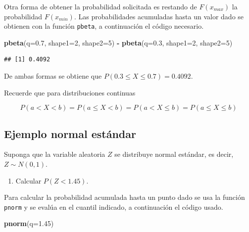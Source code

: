 \documentclass[10pt,]{krantz}
\makeatletter
\newenvironment{Shaded}{\begin{snugshade}}{\end{snugshade}}
\newcommand{\KeywordTok}[1]{\textcolor[rgb]{0.13,0.29,0.53}{\textbf{#1}}}
\newcommand{\DataTypeTok}[1]{\textcolor[rgb]{0.13,0.29,0.53}{#1}}
\newcommand{\DecValTok}[1]{\textcolor[rgb]{0.00,0.00,0.81}{#1}}
\newcommand{\FloatTok}[1]{\textcolor[rgb]{0.00,0.00,0.81}{#1}}
\newcommand{\StringTok}[1]{\textcolor[rgb]{0.31,0.60,0.02}{#1}}
\newcommand{\OperatorTok}[1]{\textcolor[rgb]{0.81,0.36,0.00}{\textbf{#1}}}
\newcommand{\NormalTok}[1]{#1}
\providecommand{\tightlist}{%
  \setlength{\itemsep}{0pt}\setlength{\parskip}{0pt}}
\newenvironment{kframe}{%
\medskip{}
\setlength{\fboxsep}{.8em}
 \def\at@end@of@kframe{}%
 \ifinner\ifhmode%
  \def\at@end@of@kframe{\end{minipage}}%
  \begin{minipage}{\columnwidth}%
 \fi\fi%
 \def\FrameCommand##1{\hskip\@totalleftmargin \hskip-\fboxsep
 \colorbox{shadecolor}{##1}\hskip-\fboxsep
     \hskip-\linewidth \hskip-\@totalleftmargin \hskip\columnwidth}%
 \MakeFramed {\advance\hsize-\width
   \@totalleftmargin\z@ \linewidth\hsize
   \@setminipage}}%
 {\par\unskip\endMakeFramed%
 \at@end@of@kframe}
\renewenvironment{Shaded}{\begin{kframe}}{\end{kframe}}
\let\BeginKnitrBlock\begin \let\EndKnitrBlock\end
\makeatother
\begin{document}
Otra forma de obtener la probabilidad solicitada es restando de
\(F(x_{max})\) la probabilidad \(F(x_{min})\). Las probabilidades
acumuladas hasta un valor dado se obtienen con la función
\texttt{pbeta}, a continuación el código necesario.

\begin{Shaded}
\begin{Highlighting}[]
\KeywordTok{pbeta}\NormalTok{(}\DataTypeTok{q=}\FloatTok{0.7}\NormalTok{, }\DataTypeTok{shape1=}\DecValTok{2}\NormalTok{, }\DataTypeTok{shape2=}\DecValTok{5}\NormalTok{) }\OperatorTok{-}\StringTok{ }\KeywordTok{pbeta}\NormalTok{(}\DataTypeTok{q=}\FloatTok{0.3}\NormalTok{, }\DataTypeTok{shape1=}\DecValTok{2}\NormalTok{, }\DataTypeTok{shape2=}\DecValTok{5}\NormalTok{)}
\end{Highlighting}
\end{Shaded}

\begin{verbatim}
## [1] 0.4092
\end{verbatim}

De ambas formas se obtiene que \(P(0.3 \leq X \leq 0.7)=0.4092\).

\BeginKnitrBlock{rmdnote}
Recuerde que para distribuciones continuas

\[ P(a < X < b) = P(a \leq X < b) = P(a < X \leq b) = P(a \leq X \leq b)\]
\EndKnitrBlock{rmdnote}

\subsection*{Ejemplo normal estándar}\label{ejemplo-normal-estandar}


Suponga que la variable aleatoria \(Z\) se distribuye normal estándar,
es decir, \(Z \sim N(0, 1)\).

\begin{enumerate}
\def\labelenumi{\arabic{enumi})}
\tightlist
\item
  Calcular \(P(Z < 1.45)\).
\end{enumerate}

Para calcular la probabilidad acumulada hasta un punto dado se usa la
función \texttt{pnorm} y se evalúa en el cuantil indicado, a
continuación el código usado.

\begin{Shaded}
\begin{Highlighting}[]
\KeywordTok{pnorm}\NormalTok{(}\DataTypeTok{q=}\FloatTok{1.45}\NormalTok{)}
\end{Highlighting}
\end{Shaded}
\end{document}
